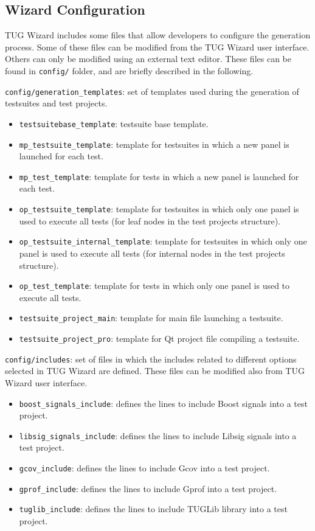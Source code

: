 
\subsection{Wizard Configuration}

TUG Wizard includes some files that allow developers to configure the
generation process. Some of these files can be modified from the TUG Wizard
user interface. Others can only be modified using an external text editor.
%
These files can be found in {\tt config/} folder, and are briefly described
in the following. 

{\tt config/generation\_templates}: set of templates used during the
generation of testsuites and test projects.
\begin{itemize}
%
\item {\tt testsuitebase\_template}: testsuite base template.
\item {\tt mp\_testsuite\_template}: template for testsuites in which a new
  panel is launched for each test.
\item {\tt mp\_test\_template}: template for tests in which a new panel is
  launched for each test.
\item {\tt op\_testsuite\_template}: template for testsuites in which only
  one panel is used to execute all tests (for leaf nodes in the test
  projects structure).
\item {\tt op\_testsuite\_internal\_template}: template for testsuites in
  which only one panel is used to execute all tests (for internal nodes in
  the test projects structure).
\item {\tt op\_test\_template}: template for tests in which only one panel
  is used to execute all tests.
\item {\tt testsuite\_project\_main}: template for main file launching a testsuite.           
\item {\tt testsuite\_project\_pro}: template for Qt project file compiling
  a testsuite.
%
\end{itemize}


{\tt config/includes}: set of files in which the includes related to
different options selected in TUG Wizard are defined. These files can be
modified also from TUG Wizard user interface.
\begin{itemize}
%
\item {\tt boost\_signals\_include}: defines the lines to include Boost
  signals into a test project.
\item {\tt libsig\_signals\_include}: defines the lines to include Libsig
  signals into a test project.
\item {\tt gcov\_include}: defines the lines to include Gcov into a test
  project.
\item {\tt gprof\_include}: defines the lines to include Gprof into a test
  project.
\item {\tt tuglib\_include}: defines the lines to include TUGLib library
  into a test project.
%
\end{itemize}
  


\newpage

